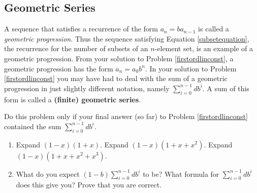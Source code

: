 \subsection{Geometric Series}
A sequence that satisfies a recurrence of the form $a_n=ba_{n-1}$ is
called a {\em geometric progression}.  Thus the sequence satisfying
Equation
\ref{subsetequation}, the recurrence for the number of subsets of an
$n$-element set, is an example of a geometric progression. From your
solution to Problem \ref{firstordlinconst}, a geometric progression has
the form $a_n=a_0b^n$.  In your solution to Problem
\ref{firstordlinconst} you may have had to deal with the sum of a
geometric progression in just slightly different notation, namely
$\sum_{i=0}^{n-1}db^i$.  A sum of this form is called a {\bf (finite)
geometric series}.

\bp 
\item Do this problem only if your final answer (so far) to Problem
\ref{firstordlinconst} contained the sum   $\sum_{i=0}^{n-1}db^i$.
\label{sumgeometricseries} 
\begin{enumerate}\item Expand $(1-x)(1+x)$.  Expand $(1-x)(1+x+x^2)$. 
Expand $(1-x)(1+x+x^2+x^3)$.  
\item What do you expect $(1-b)\sum_{i=0}^{n-1} db^i$ to be?  What
formula for $\sum_{i=0}^{n-1}db^i$ does this give you?  Prove that you
are correct.
\end{enumerate}
\ep 

